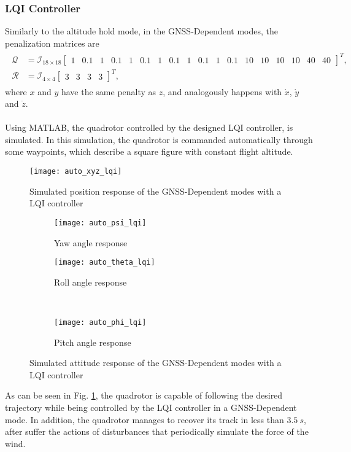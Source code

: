 \subsubsection{LQI Controller}
Similarly to the altitude hold mode, in the GNSS-Dependent modes, the penalization matrices are
\begin{align}
\label{eqn:QR_auto}
\begin{split}
\mathcal{Q} & = \mathcal{I}_{18 \times 18}\begin{bmatrix}
1 & 0.1 & 1 & 0.1 & 1 & 0.1 & 1 & 0.1 & 1 & 0.1 & 1 & 0.1 & 10 & 10 & 10 & 10 & 40 & 40
\end{bmatrix}^{T},\\
\mathcal{R} & = \mathcal{I}_{4 \times 4}\begin{bmatrix}
3 & 3 & 3 & 3
\end{bmatrix}^{T},
\end{split}
\end{align}
where $x$ and $y$ have the same penalty as $z$, and analogously happens with $\dot{x}$, $\dot{y}$ and $\dot{z}$.
\\\\
Using MATLAB, the quadrotor controlled by the designed LQI controller, is simulated. In this simulation, the quadrotor is commanded automatically through some waypoints, which describe a square figure with constant flight altitude.
\begin{figure}[h]
	\begin{center}
	\texttt{[image: auto\_xyz\_lqi]}
	\caption{Simulated position response of the GNSS-Dependent modes with a LQI controller}
	\label{fig:auto_xyz_lqi}
	\end{center}
	\end{figure}
\begin{figure}[H]
\begin{subfigure}{.5\linewidth}
\centering
\texttt{[image: auto\_psi\_lqi]}
\caption{Yaw angle response}
\label{fig:auto_psi_lqi}
\end{subfigure}%
\begin{subfigure}{.5\linewidth}
\centering
\texttt{[image: auto\_theta\_lqi]}
\caption{Roll angle response}
\label{fig:auto_theta_lqi}
\end{subfigure}\\[1ex]
\begin{subfigure}{\linewidth}
\centering
\texttt{[image: auto\_phi\_lqi]}
\caption{Pitch angle response}
\label{fig:auto_psi_lqi}
\end{subfigure}
\caption{Simulated attitude response of the GNSS-Dependent modes with a LQI controller}
\label{fig:auto_lqi}
\end{figure}
As can be seen in Fig. \ref{fig:auto_xyz_lqi}, the quadrotor is capable of following the desired trajectory while being controlled by the LQI controller in a GNSS-Dependent mode. In addition, the quadrotor manages to recover its track in less than $3.5\ s$, after suffer the actions of disturbances that periodically simulate the force of the wind.
